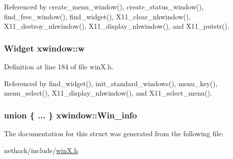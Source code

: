 Referenced by create\+\_\+menu\+\_\+window(), create\+\_\+status\+\_\+window(), find\+\_\+free\+\_\+window(), find\+\_\+widget(), X11\+\_\+clear\+\_\+nhwindow(), X11\+\_\+destroy\+\_\+nhwindow(), X11\+\_\+display\+\_\+nhwindow(), and X11\+\_\+putstr().

\hypertarget{structxwindow_a02c943a987ff220921a86f40fc5fdfda}{
\subsubsection[{w}]{\setlength{\rightskip}{0pt plus 5cm}Widget xwindow\+::w}}\label{structxwindow_a02c943a987ff220921a86f40fc5fdfda}


Definition at line 184 of file win\+X.\+h.



Referenced by find\+\_\+widget(), init\+\_\+standard\+\_\+windows(), menu\+\_\+key(), menu\+\_\+select(), X11\+\_\+display\+\_\+nhwindow(), and X11\+\_\+select\+\_\+menu().

\hypertarget{structxwindow_a2bcfbbda61d06c2065b2460506606f64}{
\subsubsection[{Win\+\_\+info}]{\setlength{\rightskip}{0pt plus 5cm}union \{ ... \}   xwindow\+::\+Win\+\_\+info}}\label{structxwindow_a2bcfbbda61d06c2065b2460506606f64}


The documentation for this struct was generated from the following file\+:\begin{DoxyCompactItemize}
\item 
nethack/include/\hyperlink{winX_8h}{win\+X.\+h}\end{DoxyCompactItemize}
